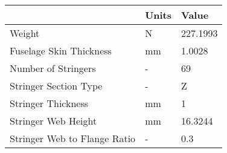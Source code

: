 \begin{tabular}{lll}
& Units & Value \\ 
\hline 
Weight & N & 227.1993 \\ 
Fuselage Skin Thickness & mm & 1.0028 \\ 
Number of Stringers & - & 69 \\ 
Stringer Section Type & - & Z \\ 
Stringer Thickness & mm & 1 \\ 
Stringer Web Height & mm & 16.3244 \\ 
Stringer Web to Flange Ratio & - & 0.3 \\ 
\hline 
\end{tabular}